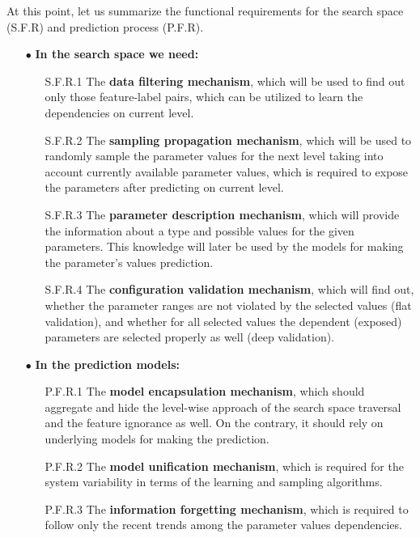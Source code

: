 At this point, let us summarize the functional requirements for the search space (S.F.R) and prediction process (P.F.R).
\begin{samepage}
\begin{itemize}
	\item[$\bullet$] \textbf{In the search space we need:}
	\begin{enumerate}
		\item[S.F.R.1] The \textbf{data filtering mechanism}, which will be used to find out only those feature-label pairs, which can be utilized to learn the dependencies on current level.
		
		\item[S.F.R.2] The \textbf{sampling propagation mechanism}, which will be used to randomly sample the parameter values for the next level taking into account currently available parameter values, which is required to expose the parameters after predicting on current level.
		
		\item[S.F.R.3] The \textbf{parameter description mechanism}, which will provide the information about a type and possible values for the given parameters. This knowledge will later be used by the models for making the parameter's values prediction.
		
		\item[S.F.R.4] The \textbf{configuration validation mechanism}, which will find out, whether the parameter ranges are not violated by the selected values (flat validation), and whether for all selected values the dependent (exposed) parameters are selected properly as well (deep validation).
	\end{enumerate}

	\item[$\bullet$] \textbf{In the prediction models:}
	\begin{enumerate}
		\item[P.F.R.1] The \textbf{model encapsulation mechanism}, which should aggregate and hide the level-wise approach of the search space traversal and the feature ignorance as well. On the contrary, it should rely on underlying models for making the prediction.
		
		\item[P.F.R.2] The \textbf{model unification mechanism}, which is required for the system variability in terms of the learning and sampling algorithms.
		
		\item[P.F.R.3] The \textbf{information forgetting mechanism}, which is required to follow only the recent trends among the parameter values dependencies.
	\end{enumerate}
\end{itemize}
\end{samepage}

